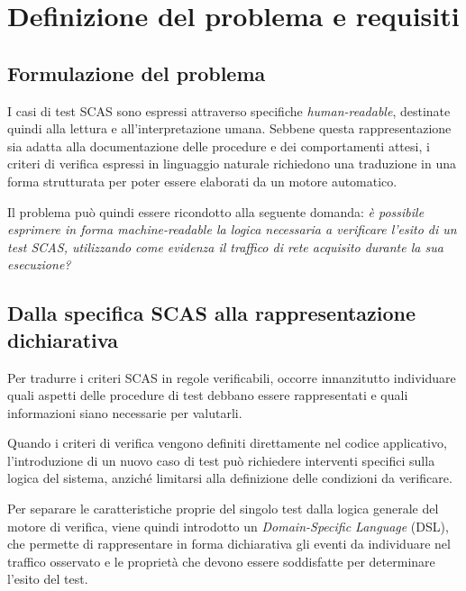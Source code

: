 \chapter{Definizione del problema e requisiti}\label{definizione-del-problema-e-requisiti}

\section{Formulazione del problema}\label{formulazione-del-problema}

I casi di test SCAS sono espressi attraverso specifiche \emph{human-readable}, destinate quindi alla lettura e all'interpretazione umana. Sebbene questa rappresentazione sia adatta alla documentazione delle procedure e dei comportamenti attesi, i criteri di verifica espressi in linguaggio naturale richiedono una traduzione in una forma strutturata per poter essere elaborati da un motore automatico.

Il problema può quindi essere ricondotto alla seguente domanda: \emph{è possibile esprimere in forma machine-readable la logica necessaria a verificare l'esito di un test SCAS, utilizzando come evidenza il traffico di rete acquisito durante la sua esecuzione?}

\section{Dalla specifica SCAS alla rappresentazione dichiarativa}\label{dalla-specifica-scas-alla-rappresentazione-dichiarativa}

Per tradurre i criteri SCAS in regole verificabili, occorre innanzitutto individuare quali aspetti delle procedure di test debbano essere rappresentati e quali informazioni siano necessarie per valutarli.

Quando i criteri di verifica vengono definiti direttamente nel codice applicativo, l'introduzione di un nuovo caso di test può richiedere interventi specifici sulla logica del sistema, anziché limitarsi alla definizione delle condizioni da verificare.

Per separare le caratteristiche proprie del singolo test dalla logica generale del motore di verifica, viene quindi introdotto un \emph{Domain-Specific Language} (DSL), che permette di rappresentare in forma dichiarativa gli eventi da individuare nel traffico osservato e le proprietà che devono essere soddisfatte per determinare l'esito del test.

